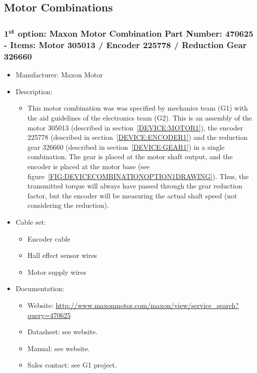 \subsection{Motor Combinations}
\subsubsection{1\textsuperscript{st} option: Maxon Motor Combination Part Number: 470625 - Items: Motor 305013 / Encoder 225778 / Reduction Gear 326660} \label{DEVICE:COMBINATION1}
\begin{itemize}
  \item Manufacturer: Maxon Motor
  \item Description:
  \begin{itemize}
    \item This motor combination was was specified by mechanics team (G1) with the aid guidelines of the electronics team (G2). This is an assembly of the motor 305013 (described in section~\ref{DEVICE:MOTOR1}), the encoder 225778 (described in section~\ref{DEVICE:ENCODER1}) and the reduction gear 326660 (described in section~\ref{DEVICE:GEAR1}) in a single combination. The gear is placed at the motor shaft output, and the encoder is placed at the motor base (see figure~\ref{FIG:DEVICECOMBINATIONOPTION1DRAWING}). Thus, the transmitted torque will always have passed through the gear reduction factor, but the encoder will be measuring the actual shaft speed (not considering the reduction).
  \end{itemize}
  \item Cable set:
  \begin{itemize}
    \item Encoder cable
    \item Hall effect sensor wires
    \item Motor supply wires
  \end{itemize}
  \item Documentation:
  \begin{itemize}
    \item Website: \href{http://www.maxonmotor.com/maxon/view/service\_search?query=470625}{http://www.maxonmotor.com/maxon/view/service\_search?query=470625}
    \item Datasheet: see website.
    \item Manual: see website.
    \item Sales contact: see G1 project.
  \end{itemize}
\end{itemize}
